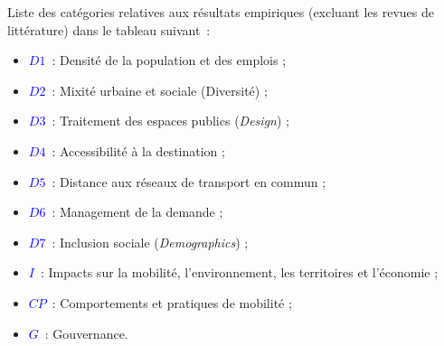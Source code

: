 Liste des catégories relatives aux résultats empiriques (excluant les revues de littérature) dans le tableau suivant~:
\begin{itemize}
    \item \textcolor{blue}{$D1$}~: Densité de la population et des emplois ;
    \item \textcolor{blue}{$D2$}~: Mixité urbaine et sociale (Diversité) ;
    \item \textcolor{blue}{$D3$}~: Traitement des espaces publics (\textsl{Design}) ;
    \item \textcolor{blue}{$D4$}~: Accessibilité à la destination ;
    \item \textcolor{blue}{$D5$}~: Distance aux réseaux de transport en commun ;
    \item \textcolor{blue}{$D6$}~: Management de la demande ;
    \item \textcolor{blue}{$D7$}~: Inclusion sociale (\textsl{Demographics}) ;
    \item \textcolor{blue}{$I$}~: Impacts sur la mobilité, l'environnement, les territoires et l'économie ;
    \item \textcolor{blue}{$CP$}~: Comportements et pratiques de mobilité ;
     \item \textcolor{blue}{$G$}~: Gouvernance.
\end{itemize}

